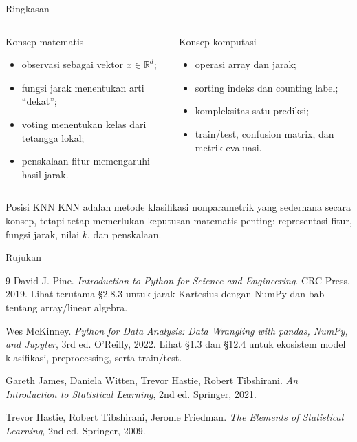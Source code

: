 \documentclass[aspectratio=169,11pt]{beamer}
\begin{document}
\begin{frame}{Ringkasan}
\begin{columns}[T]
\begin{block}{Konsep matematis}
\small
\begin{itemize}
  \item observasi sebagai vektor $x\in\mathbb{R}^d$;
  \item fungsi jarak menentukan arti ``dekat'';
  \item voting menentukan kelas dari tetangga lokal;
  \item penskalaan fitur memengaruhi hasil jarak.
\end{itemize}
\end{block}
\begin{block}{Konsep komputasi}
\small
\begin{itemize}
  \item operasi array dan jarak;
  \item sorting indeks dan counting label;
  \item kompleksitas satu prediksi;
  \item train/test, confusion matrix, dan metrik evaluasi.
\end{itemize}
\end{block}
\end{columns}
\begin{alertblock}{Posisi KNN}
\small
KNN adalah metode klasifikasi nonparametrik yang sederhana secara konsep, tetapi tetap memerlukan keputusan matematis penting: representasi fitur, fungsi jarak, nilai $k$, dan penskalaan.
\end{alertblock}
\end{frame}

\begin{frame}{Rujukan}
\footnotesize
\begin{thebibliography}{9}
David J. Pine. \textit{Introduction to Python for Science and Engineering}. CRC Press, 2019. Lihat terutama \S2.8.3 untuk jarak Kartesius dengan NumPy dan bab tentang array/linear algebra.

Wes McKinney. \textit{Python for Data Analysis: Data Wrangling with pandas, NumPy, and Jupyter}, 3rd ed. O'Reilly, 2022. Lihat \S1.3 dan \S12.4 untuk ekosistem model klasifikasi, preprocessing, serta train/test.

Gareth James, Daniela Witten, Trevor Hastie, Robert Tibshirani. \textit{An Introduction to Statistical Learning}, 2nd ed. Springer, 2021.

Trevor Hastie, Robert Tibshirani, Jerome Friedman. \textit{The Elements of Statistical Learning}, 2nd ed. Springer, 2009.
\end{thebibliography}
\end{frame}
\end{document}
